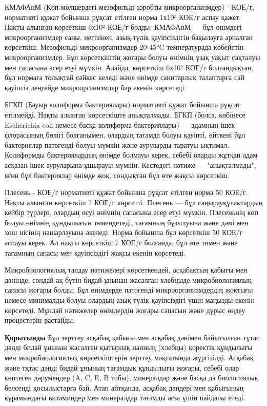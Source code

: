 \begin{multicols}{2}
КМАФАнМ (Көп мөлшердегі мезофильді аэробты микроорганизмдер) - КОЕ/г,
нормативті құжат бойынша рұқсат етілген норма 1х10³ КОЕ/г аспау қажет.
Нақты алынған көрсеткіш 6х10² КОЕ/г болды. КМАФАнМ --- бұл өнімдегі
микроорганизмдер саны, негізінен, азық-түлік қауіпсіздігін бақылауға
арналған көрсеткіш. Мезофильді микроорганизмдер 20-45°C температурада
көбейетін микроорганизмдер. Бұл көрсеткіштің жоғары болуы өнімнің ұзақ
уақыт сақталуы мен сапасына әсер етуі мүмкін. Алайда, көрсеткіш 6х10²
КОЕ/г болғандықтан, бұл нормаға толықтай сәйкес келеді және өнімде
санитарлық талаптарға сай қауіпсіз деңгейде микроорганизмдер бар екенін
көрсетеді.

БГКП (Бауыр колиформа бактериялары) нормативті құжат бойынша рұқсат
етілмейді. Нақты алынған көрсеткіште анықталмады. БГКП (болса, көбінесе
Escherichia coli немесе басқа колиформа бактериялары) --- адамның ішек
флорасының бөлігі болғанымен, олардың тағамда болуы қауіпті, өйткені бұл
бактериялар патогенді болуы мүмкін және ауруларды таратуы ықтимал.
Колиформды бактериялардың өнімде болмауы керек, себебі оларды жұтқан
адам асқазан-ішек ауруларына ұшырауы мүмкін. Кестедегі нәтиже ---
"анықталмады", яғни бұл бактериялар өнімде жоқ, сондықтан бұл өте жақсы
көрсеткіш.

Плесень - КОЕ/г нормативті құжат бойынша рұқсат етілген норма 50 КОЕ/г.
Нақты алынған көрсеткіш 7 КОЕ/г көрсетті. Плесень --- бұл
саңырауқұлақтардың кейбір түрлері, олардың өсуі өнімнің сапасына әсер
етуі мүмкін. Плесеньнің көп болуы өнімнің құндылығын төмендетеді,
тағамның бұзылуына және дәмі мен хош иісінің нашарлауына әкеледі. Норма
бойынша бұл көрсеткіш 50 КОЕ/г аспауы керек. Ал нақты көрсеткіш 7 КОЕ/г
болғанда, бұл өте төмен және тағамның сапасы мен қауіпсіздігі жақсы
екенін көрсетеді.

Микробиологиялық талдау нәтижелері көрсеткендей, асқабақтың қабығы мен
дәнінде, сондай-ақ бүтін бидай ұнынан жасалған хлебцыде микробиологиялық
сапасы жоғары болды. Бұл өнімдерде патогенді микроорганизмдердің жоқтығы
немесе минималды болуы олардың азық-түлік қауіпсіздігі үшін маңызды
екенін көрсетеді. Мұндай нәтижелер өнімдердің жоғары сапасын және дұрыс
өңдеу процестерін растайды.

{\bfseries Қорытынды} Бұл зерттеу асқабақ қабығы мен асқабақ дәнімен
байытылған тұтас дәнді бидай ұнынан жасалған қытырлақ нанның (хлебцы)
қоректік құндылығы мен микробиологиялық көрсеткіштерін зерттеу
мақсатында жүргізілді. Асқабақ және тқтас дәнді бидай ұнының тағамдық
құндылығы жоғары, себебі олар көптеген дәрумендер (A, C, E, B тобы),
минералдар және басқа да биологиялық белсенді қосылыстарға бай. Атап
айтқанда, асқабақ дәндері мен қабығының құрамындағы витаминдер мен
минералдар тағамды ағза үшін пайдалы етеді.


\end{multicols}

